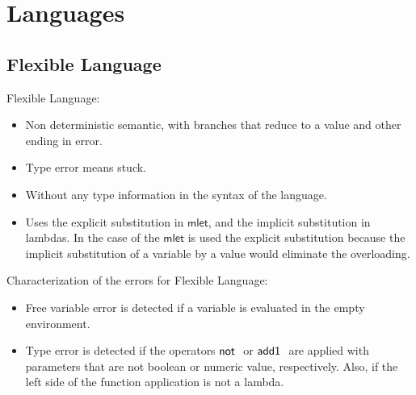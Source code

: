 \documentclass[preprint,authoryear,sort&compress,9pt,nocopyrightspace]{article}
\newcommand{\negacion}[1]{\mathsf{not} \ #1}
\newcommand{\suma}[1]{\mathsf{add1} \ #1}
\newcommand{\semanticA}{Flexible Language}
\begin{document}
\section{Languages}

\subsection{\semanticA}

\semanticA:
\begin{itemize}
\item Non deterministic semantic, with branches that reduce to a value and other ending in error.
\item Type error means stuck.
\item Without any type information in the syntax of the language.
\item Uses the explicit substitution in $\mathsf{mlet}$, and the implicit substitution in lambdas. In the case of the $\mathsf{mlet}$ is used the explicit substitution because the implicit substitution of a variable by a value would eliminate the overloading.
\end{itemize} 
Characterization of the errors for \semanticA:
\begin{itemize}
\item Free variable error is detected if a variable is evaluated in the empty environment.
\item Type error is detected if the operators $\negacion$ or $\suma$ are applied with parameters that are not boolean or numeric value, respectively. Also, if the left side of the function application is not a lambda.
\end{itemize}
\end{document}
